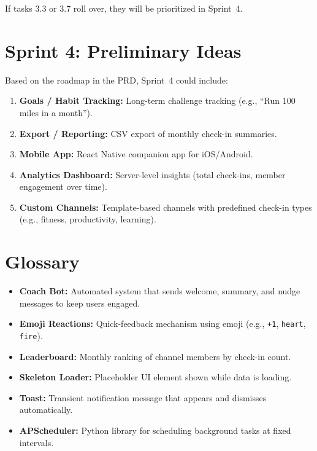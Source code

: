 \documentclass[11pt]{article}
\begin{document}
If tasks 3.3 or 3.7 roll over, they will be prioritized in Sprint~4.

\section{Sprint 4: Preliminary Ideas}

Based on the roadmap in the PRD, Sprint~4 could include:

\begin{enumerate}[leftmargin=1.5em]
    \item \textbf{Goals / Habit Tracking:} Long-term challenge tracking (e.g., ``Run 100 miles in a month'').
    \item \textbf{Export / Reporting:} CSV export of monthly check-in summaries.
    \item \textbf{Mobile App:} React Native companion app for iOS/Android.
    \item \textbf{Analytics Dashboard:} Server-level insights (total check-ins, member engagement over time).
    \item \textbf{Custom Channels:} Template-based channels with predefined check-in types (e.g., fitness, productivity, learning).
\end{enumerate}

\section{Glossary}

\begin{itemize}[leftmargin=1.5em]
    \item \textbf{Coach Bot:} Automated system that sends welcome, summary, and nudge messages to keep users engaged.
    \item \textbf{Emoji Reactions:} Quick-feedback mechanism using emoji (e.g., \texttt{+1}, \texttt{heart}, \texttt{fire}).
    \item \textbf{Leaderboard:} Monthly ranking of channel members by check-in count.
    \item \textbf{Skeleton Loader:} Placeholder UI element shown while data is loading.
    \item \textbf{Toast:} Transient notification message that appears and dismisses automatically.
    \item \textbf{APScheduler:} Python library for scheduling background tasks at fixed intervals.
\end{itemize}
\end{document}
